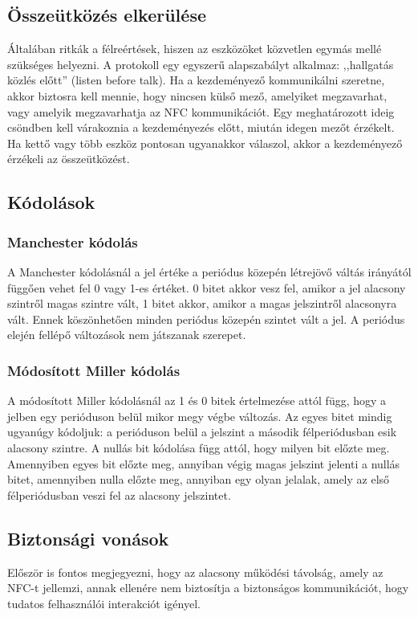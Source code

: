 \documentclass[12pt]{article}
\begin{document}
\subsection{Összeütközés elkerülése}
Általában ritkák a félreértések, hiszen az eszközöket közvetlen egymás mellé 
szükséges helyezni. A protokoll egy egyszerű alapszabályt alkalmaz: ,,hallgatás
közlés előtt'' (listen before talk). Ha a kezdeményező kommunikálni szeretne,
akkor biztosra kell mennie, hogy nincsen külső mező, amelyiket megzavarhat,
vagy amelyik megzavarhatja az NFC kommunikációt. Egy meghatározott 
ideig csöndben kell várakoznia a kezdeményezés előtt, miután idegen mezőt 
érzékelt. Ha kettő vagy több eszköz pontosan ugyanakkor válaszol, akkor a
kezdeményező érzékeli az összeütközést.

\subsection{Kódolások}

\subsubsection{Manchester kódolás}
A Manchester kódolásnál a jel értéke a periódus közepén létrejövő váltás irányától
függően vehet fel 0 vagy 1-es értéket. 0 bitet akkor vesz fel, amikor a jel
alacsony szintről magas szintre vált, 1 bitet akkor, amikor a magas jelszintről
alacsonyra vált. Ennek köszönhetően minden periódus közepén szintet vált a jel.
A periódus elején fellépő változások nem játszanak szerepet.

\subsubsection{Módosított Miller kódolás}
A módosított Miller kódolásnál az 1 és 0 bitek értelmezése attól függ, hogy
a jelben egy perióduson belül mikor megy végbe változás. Az egyes bitet
mindig ugyanúgy kódoljuk: a perióduson belül a jelszint a második félperiódusban
esik alacsony szintre. A nullás bit kódolása függ attól, hogy milyen bit előzte meg.
Amennyiben egyes bit előzte meg, annyiban végig magas jelszint jelenti a nullás
bitet, amennyiben nulla előzte meg, annyiban egy olyan jelalak, amely az első
félperiódusban veszi fel az alacsony jelszintet.

\subsection{Biztonsági vonások}
Először is fontos megjegyezni, hogy az alacsony működési távolság, amely az NFC-t
jellemzi, annak ellenére nem biztosítja a biztonságos kommunikációt, hogy tudatos
felhasználói interakciót igényel.
\end{document}

